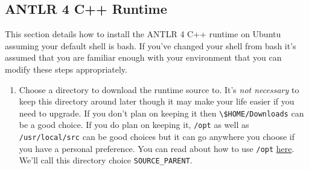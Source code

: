 \documentclass[../setup.tex]{subfiles}
\begin{document}
\subsection{ANTLR 4 C++ Runtime}
This section details how to install the ANTLR 4 C++ runtime on Ubuntu assuming your default shell
is bash. If you've changed your shell from bash it's assumed that you are familiar enough with your
environment that you can modify these steps appropriately.
\begin{enumerate}
  \item
    Choose a directory to download the runtime source to. It's \emph{not necessary} to keep this
    directory around later though it may make your life easier if you need to upgrade. If you don't
    plan on keeping it then \lstinline{\$HOME/Downloads} can be a good choice. If you do plan on
    keeping it, \lstinline{/opt} as well as \lstinline{/usr/local/src} can be good choices but it
    can go anywhere you choose if you have a personal preference. You can read about how to use
    \lstinline{/opt} \href{https://askubuntu.com/a/34922/550300} {here}. We'll call this directory choice
    \lstinline{SOURCE_PARENT}.


\end{enumerate}
\end{document}
